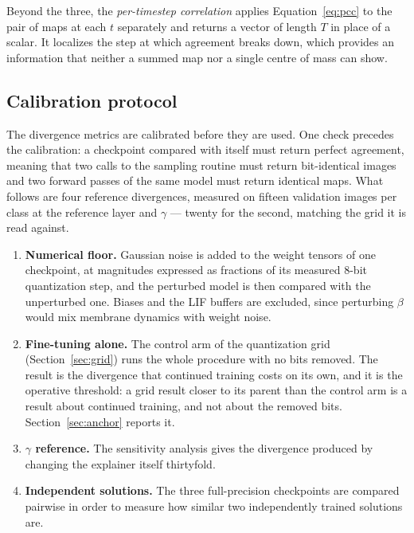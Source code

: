 Beyond the three, the \emph{per-timestep correlation} applies
Equation~\ref{eq:pcc} to the pair of maps at each $t$ separately and returns a
vector of length $T$ in place of a scalar. It localizes the step at which
agreement breaks down, which provides an information that neither
a summed map nor a single centre of mass can show.
 
\subsection{Calibration protocol}
\label{sec:calibration-protocol}

The divergence metrics are calibrated before they are used. One check precedes
the calibration: a checkpoint compared with itself must return perfect
agreement, meaning that two calls to the sampling routine must return bit-identical images
and two forward passes of the same model must return identical maps. What
follows are four reference divergences, measured on fifteen validation images
per class at the reference layer and $\gamma$ --- twenty for the second,
matching the grid it is read against.

\begin{enumerate}
  \item \textbf{Numerical floor.} Gaussian noise is added to the weight tensors
        of one checkpoint, at magnitudes expressed as fractions of its measured
        8-bit quantization step, and the perturbed model is then compared with
        the unperturbed one. Biases and the LIF buffers are excluded, since
        perturbing $\beta$ would mix membrane dynamics with weight noise.
  \item \textbf{Fine-tuning alone.} The control arm of the quantization grid
        (Section~\ref{sec:grid}) runs the whole procedure with no bits removed.
        The result is the divergence that continued training costs on its
        own, and it is the operative threshold: a grid result closer to its
        parent than the control arm is a result about continued training, and not
        about the removed bits. Section~\ref{sec:anchor} reports it.
  \item \textbf{$\gamma$ reference.} The sensitivity analysis gives the
        divergence produced by changing the explainer itself thirtyfold.
  \item \textbf{Independent solutions.} The three full-precision checkpoints are
        compared pairwise in order to measure how similar two independently trained
        solutions are.
\end{enumerate}